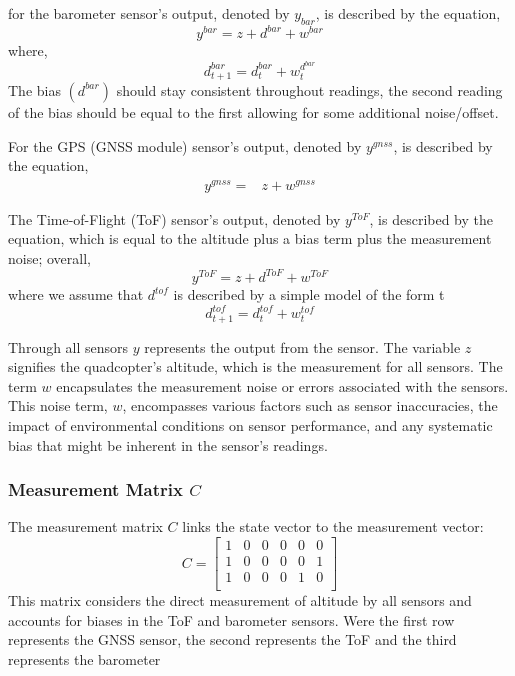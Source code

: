 \documentclass{report}
\begin{document}
    for the barometer sensor's output, denoted by \( y_{bar} \), is described
    by the equation,
    \begin{equation}
    y^{bar} = z + d^{bar} + w^{bar}
    \end{equation}
    where, 
    \begin{equation}
        d^{bar}_{t+1} = d^{bar}_t + w_{t}^{d^{bar}}
    \end{equation}
    The bias $(d^{bar})$ should stay consistent throughout readings, the second
    reading of the bias should be equal to the first allowing for some
    additional noise/offset.

    For the GPS (GNSS module) sensor's output, denoted by \( y^{gnss} \), is
    described by the equation,
    \begin{subequations}
        \begin{align}
            y^{gnss} 
            {}={}&
            z + w^{gnss} 
        \end{align}
    \end{subequations}

    The Time-of-Flight (ToF) sensor's output, denoted by \( y^{ToF} \), is
    described by the equation, which is equal to the altitude plus a bias term
    plus the measurement noise; overall,
    \begin{equation}
    y^{ToF} = z + d^{ToF} + w^{ToF}
    \end{equation}
    where we assume that \(d^{tof}\) is described by a simple model of the form
    t
    \begin{equation}
    d^{tof}_{t+1} = d^{tof}_t + w^{tof}_t
    \end{equation}

    Through all sensors \( y \) represents the output from the sensor. The
    variable \( z \) signifies the quadcopter's altitude, which is the
    measurement for all sensors. The term \( w \) encapsulates the measurement
    noise or errors associated with the sensors. This noise term, \( w \),
    encompasses various factors such as sensor inaccuracies, the impact of
    environmental conditions on sensor performance, and any systematic bias that
    might be inherent in the sensor's readings.

    \subsubsection*{Measurement Matrix \( C \)}
    The measurement matrix \( C \) links the state vector to the measurement
    vector:
    \begin{equation}
    C = 
    \begin{bmatrix}
    1 & 0 & 0 & 0 & 0 & 0 \\
    1 & 0 & 0 & 0 & 0 & 1 \\
    1 & 0 & 0 & 0 & 1 & 0 \\
    \end{bmatrix}
    \end{equation}
    This matrix considers the direct measurement of altitude by all sensors and
    accounts for biases in the ToF and barometer sensors. Were the first row represents the GNSS sensor, the second represents the ToF and the third represents the barometer
\end{document}
